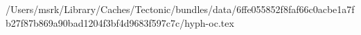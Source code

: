 /Users/msrk/Library/Caches/Tectonic/bundles/data/6ffe055852f8faf66c0acbe1a7fb27f87b869a90bad1204f3bf4d9683f597c7c/hyph-oc.tex